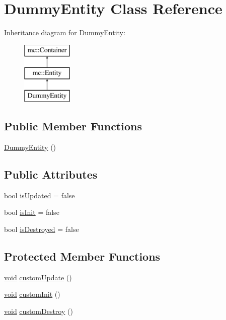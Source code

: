 \hypertarget{class_dummy_entity}{}\section{Dummy\+Entity Class Reference}
\label{class_dummy_entity}
Inheritance diagram for Dummy\+Entity\+:\begin{figure}[H]
\begin{center}
\leavevmode
\includegraphics[height=3.000000cm]{class_dummy_entity}
\end{center}
\end{figure}
\subsection*{Public Member Functions}
\begin{DoxyCompactItemize}
\item 
\hyperlink{class_dummy_entity_a4a80b95d7f6abdbc15e9a0545165415b}{Dummy\+Entity} ()
\end{DoxyCompactItemize}
\subsection*{Public Attributes}
\begin{DoxyCompactItemize}
\item 
bool \hyperlink{class_dummy_entity_aecb9da8269df00e4864787b38017131c}{is\+Updated} = false
\item 
bool \hyperlink{class_dummy_entity_ac100cd068f11a70d7f7bf5c032152598}{is\+Init} = false
\item 
bool \hyperlink{class_dummy_entity_ab0099f93e79f47dc4aead42a4e75c628}{is\+Destroyed} = false
\end{DoxyCompactItemize}
\subsection*{Protected Member Functions}
\begin{DoxyCompactItemize}
\item 
\hyperlink{_s_d_l__opengles2__gl2ext_8h_ae5d8fa23ad07c48bb609509eae494c95}{void} \hyperlink{class_dummy_entity_a177c12b9690a2b13e0b7968f98299bc0}{custom\+Update} ()
\item 
\hyperlink{_s_d_l__opengles2__gl2ext_8h_ae5d8fa23ad07c48bb609509eae494c95}{void} \hyperlink{class_dummy_entity_a34d6a19a782461ca2bbef8337df3b22f}{custom\+Init} ()
\item 
\hyperlink{_s_d_l__opengles2__gl2ext_8h_ae5d8fa23ad07c48bb609509eae494c95}{void} \hyperlink{class_dummy_entity_a9e7c6555400befc5c1d658523c32ac64}{custom\+Destroy} ()
\end{DoxyCompactItemize}
